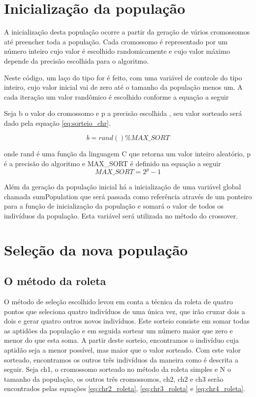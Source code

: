 \documentclass[
    12pt,               %
    oneside,%
    a4paper,            %
    english,            %
    french,             %
    spanish,            %
    brazil,             %
    ]{abntex2}
\begin{document}
\section{Inicialização da população}

  A inicialização desta população ocorre a partir da geração de vários cromossomos até preencher toda a população. Cada cromossomo é representado por um número inteiro cujo valor é escolhido randomicamente e cujo valor máximo depende da precisão escolhida para o algoritmo. 

  Neste código, um laço do tipo for é feito, com uma variável de controle do tipo inteiro, cujo valor inicial vai de zero até o tamanho da população menos um. A cada iteração um valor randômico é escolhido conforme a equação  a seguir

  Seja b o valor do cromossomo e p a precisão escolhida , seu valor sorteado será dado pela equação \ref{eq:sorteio_chr}.

  \begin{equation}  
    b = rand() \% MAX\_SORT
    \label{eq:sorteio_chr}
  \end{equation}

  onde rand é uma função da linguagem C que retorna um valor inteiro aleatório, p é a precisão do algoritmo e  MAX\_SORT é definido na equação a seguir 
  \begin{equation}
    MAX\_SORT = 2^p-1
    \label{eq: sort_max}
  \end{equation}

  Além da geração da população inicial há a inicialização de uma variável global chamada sumPopulation que será passada como referência através de um ponteiro para a função de inicialização da população e somará o valor de todos os indivíduos da população. Esta variável será utilizada no método do crossover.

\section{Seleção da nova população}

\subsection{O método da roleta}

  O método de seleção escolhido levou em conta a técnica da roleta de quatro pontos que seleciona quatro indivíduos de uma única vez, que irão cruzar dois a dois e gerar quatro outros novos indivíduos.  Este sorteio consiste em somar todas as aptidões da população e em seguida sortear um número maior que zero e menor do que esta soma. A partir deste sorteio, encontramos o indivíduo cuja aptidão seja a menor possível, mas maior que o valor sorteado.  Com este valor sorteado, encontramos os outros três indivíduos da maneira como é descrita a seguir. 
  Seja  ch1, o cromossomo sorteado no método da roleta simples e N o tamanho da população, os outros três cromossomos, ch2, ch2 e ch3 serão encontrados pelas equações \ref{eq:chr2_roleta}, \ref{eq:chr3_roleta} e \ref{eq:chr4_roleta}.
\end{document}
